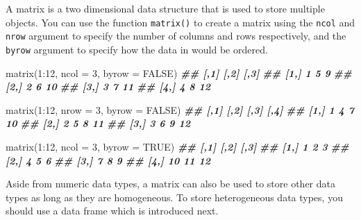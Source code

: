 \documentclass[
]{book}
\newenvironment{Shaded}{\begin{snugshade}}{\end{snugshade}}
\newcommand{\AttributeTok}[1]{\textcolor[rgb]{0.77,0.63,0.00}{#1}}
\newcommand{\ConstantTok}[1]{\textcolor[rgb]{0.00,0.00,0.00}{#1}}
\newcommand{\DecValTok}[1]{\textcolor[rgb]{0.00,0.00,0.81}{#1}}
\newcommand{\DocumentationTok}[1]{\textcolor[rgb]{0.56,0.35,0.01}{\textbf{\textit{#1}}}}
\newcommand{\FunctionTok}[1]{\textcolor[rgb]{0.00,0.00,0.00}{#1}}
\newcommand{\NormalTok}[1]{#1}
\newcommand{\SpecialCharTok}[1]{\textcolor[rgb]{0.00,0.00,0.00}{#1}}
\begin{document}
A matrix is a two dimensional data structure that is used to store multiple objects. You can use the function \texttt{matrix()} to create a matrix using the \texttt{ncol} and \texttt{nrow} argument to specify the number of columns and rows respectively, and the \texttt{byrow} argument to specify how the data in would be ordered.

\begin{Shaded}
\begin{Highlighting}[]
\FunctionTok{matrix}\NormalTok{(}\DecValTok{1}\SpecialCharTok{:}\DecValTok{12}\NormalTok{, }\AttributeTok{ncol =} \DecValTok{3}\NormalTok{, }\AttributeTok{byrow =} \ConstantTok{FALSE}\NormalTok{)}
\DocumentationTok{\#\#      [,1] [,2] [,3]}
\DocumentationTok{\#\# [1,]    1    5    9}
\DocumentationTok{\#\# [2,]    2    6   10}
\DocumentationTok{\#\# [3,]    3    7   11}
\DocumentationTok{\#\# [4,]    4    8   12}

\FunctionTok{matrix}\NormalTok{(}\DecValTok{1}\SpecialCharTok{:}\DecValTok{12}\NormalTok{, }\AttributeTok{nrow =} \DecValTok{3}\NormalTok{, }\AttributeTok{byrow =} \ConstantTok{FALSE}\NormalTok{)}
\DocumentationTok{\#\#      [,1] [,2] [,3] [,4]}
\DocumentationTok{\#\# [1,]    1    4    7   10}
\DocumentationTok{\#\# [2,]    2    5    8   11}
\DocumentationTok{\#\# [3,]    3    6    9   12}

\FunctionTok{matrix}\NormalTok{(}\DecValTok{1}\SpecialCharTok{:}\DecValTok{12}\NormalTok{, }\AttributeTok{ncol =} \DecValTok{3}\NormalTok{, }\AttributeTok{byrow =} \ConstantTok{TRUE}\NormalTok{)}
\DocumentationTok{\#\#      [,1] [,2] [,3]}
\DocumentationTok{\#\# [1,]    1    2    3}
\DocumentationTok{\#\# [2,]    4    5    6}
\DocumentationTok{\#\# [3,]    7    8    9}
\DocumentationTok{\#\# [4,]   10   11   12}
\end{Highlighting}
\end{Shaded}

Aside from numeric data types, a matrix can also be used to store other data types as long as they are homogeneous. To store heterogeneous data types, you should use a data frame which is introduced next.
\end{document}
